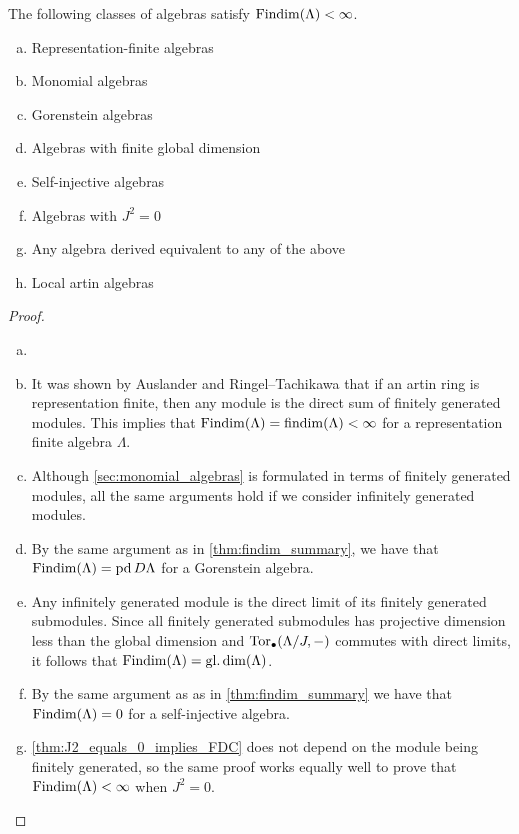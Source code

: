 \begin{theorem}\label{thm:Findim_summary}
	The following classes of algebras satisfy $\operatorname{Findim}(\Lambda) < \infty$.
	\begin{enumerate}[a)]
		\item Representation-finite algebras
		\item Monomial algebras
		\item Gorenstein algebras
		\item Algebras with finite global dimension
		\item Self-injective algebras
		\item Algebras with $J^2=0$
		\item Any algebra derived equivalent to any of the above
		\item Local artin algebras
	\end{enumerate}
	\begin{proof}
		\begin{enumerate}[(a)]
			\item[]
			\item It was shown by Auslander and Ringel--Tachikawa that if an artin ring is representation finite, then any module is the direct sum of finitely generated modules\cite[II Proposition~4.3(c)]{Aus74}\cite[Corollary~4.4]{RT74}. This implies that $\operatorname{Findim}(\Lambda) = \operatorname{findim}(\Lambda) < \infty$ for a representation finite algebra $\Lambda$.
			\item Although \cref{sec:monomial_algebras} is formulated in terms of finitely generated modules, all the same arguments hold if we consider infinitely generated modules. 
			\item \label{item:Findim_gorenstein} By the same argument as in \cref{thm:findim_summary}, we have that $\operatorname{Findim}(\Lambda) = \operatorname{pd} D\Lambda$ for a Gorenstein algebra.
			\item Any infinitely generated module is the direct limit of its finitely generated submodules. Since all finitely generated submodules has projective dimension less than the global dimension and $\operatorname{Tor}_\bullet(\Lambda/J, -)$ commutes with direct limits, it follows that $\operatorname{Findim}(\Lambda) = \operatorname{gl.dim}(\Lambda)$.
			\item By the same argument as as in \cref{thm:findim_summary} we have that $\operatorname{Findim}(\Lambda) = 0$ for a self-injective algebra.
			\item \cref{thm:J2_equals_0_implies_FDC} does not depend on the module being finitely generated, so the same proof works equally well to prove that $\operatorname{Findim}(\Lambda) < \infty$ when $J^2 = 0$.

\end{enumerate}
\end{proof}
\end{theorem}

